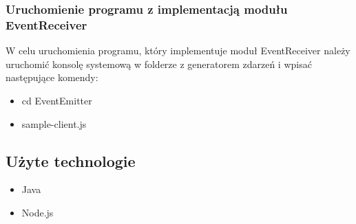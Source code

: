 \subsubsection{Uruchomienie programu z implementacją modułu EventReceiver}
W celu uruchomienia programu, który implementuje moduł EventReceiver należy uruchomić konsolę systemową w folderze z generatorem zdarzeń i wpisać następujące komendy:
\begin{itemize}[noitemsep]
  \item cd EventEmitter
  \item sample-client.js
\end{itemize}


\subsection{Użyte technologie}
\begin{itemize}[noitemsep]
  \item Java
  \item Node.js
\end{itemize}